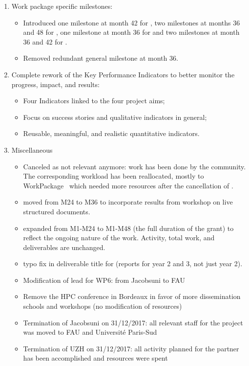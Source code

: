 \begin{enumerate}
\item Work package specific milestones:
  \begin{itemize}
  \item Introduced one milestone at month 42 for
    , two milestones at months 36 and 48
    for , one milestone at month 36 for  and two
    milestones at month 36 and 42 for .
  \item Removed redundant general milestone at month 36.
  \end{itemize}
\item Complete rework of the Key Performance Indicators to better
  monitor the progress, impact, and results:
  \begin{itemize}
  \item Four Indicators linked to the four project aims;
  \item Focus on success stories and qualitative indicators in general;
  \item Reusable, meaningful, and realistic quantitative indicators.
  \end{itemize} 
\item Miscellaneous
  \begin{itemize}
  \item Canceled  as
    not relevant anymore: work has been done by the community. The
    corresponding workload has been reallocated, mostly to
    WorkPackage~ which needed more resources after the cancellation of .
  \item {} moved from M24 to M36 to incorporate results
    from workshop on live structured documents.
  \item {} expanded from M1-M24 to M1-M48 (the full duration of the grant)
    to reflect the ongoing nature of the work. Activity, total work,
    and deliverables are unchanged.
  \item typo fix in deliverable title for 
    (reports for year 2 and 3, not just year 2).
  \item Modification of lead for WP6: from Jacobsuni to FAU
  \item Remove the HPC conference in Bordeaux in favor of more dissemination schools and workshops (no modification of resources)
  \item Termination of Jacobsuni on 31/12/2017: all relevant staff for the project was moved to FAU and Université Paris-Sud
  \item Termination of UZH on 31/12/2017: all activity planned for the partner has been accomplished and resources were spent
  \end{itemize}
\end{enumerate}


\clearpage
\setcounter{page}{1}

